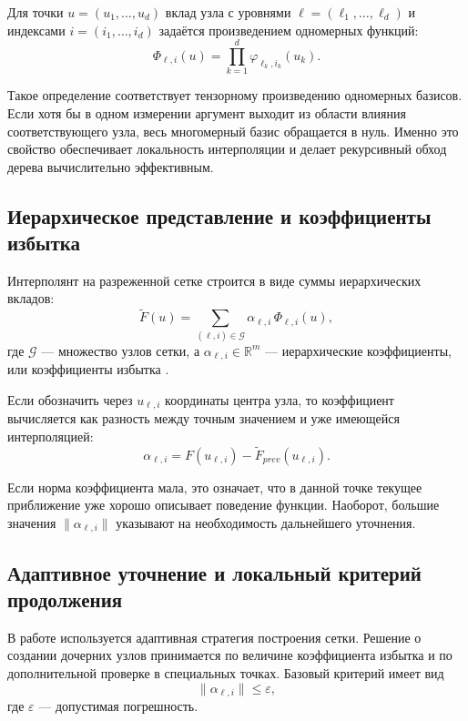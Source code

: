 Для точки $u = (u_1, \dots, u_d)$ вклад узла с уровнями $\ell = (\ell_1, \dots, \ell_d)$ и индексами $i = (i_1, \dots, i_d)$ задаётся произведением одномерных функций:
\begin{equation}
    \Phi_{\ell,i}(u) = \prod_{k=1}^{d} \varphi_{\ell_k,i_k}(u_k).
\end{equation}

Такое определение соответствует тензорному произведению одномерных базисов. Если хотя бы в одном измерении аргумент выходит из области влияния соответствующего узла, весь многомерный базис обращается в нуль. Именно это свойство обеспечивает локальность интерполяции и делает рекурсивный обход дерева вычислительно эффективным.

\subsection{Иерархическое представление и коэффициенты избытка}

Интерполянт на разреженной сетке строится в виде суммы иерархических вкладов:
\begin{equation}
    \widetilde{F}(u) = \sum_{(\ell,i) \in \mathcal{G}} \alpha_{\ell,i} \, \Phi_{\ell,i}(u),
\end{equation}
где $\mathcal{G}$ --- множество узлов сетки, а $\alpha_{\ell,i} \in \mathbb{R}^m$ --- иерархические коэффициенты, или коэффициенты избытка \cite{Bungartz2004}.

Если обозначить через $u_{\ell,i}$ координаты центра узла, то коэффициент вычисляется как разность между точным значением и уже имеющейся интерполяцией:
\begin{equation}
    \alpha_{\ell,i} = F(u_{\ell,i}) - \widetilde{F}_{prev}(u_{\ell,i}).
\end{equation}

Если норма коэффициента мала, это означает, что в данной точке текущее приближение уже хорошо описывает поведение функции. Наоборот, большие значения $\|\alpha_{\ell,i}\|$ указывают на необходимость дальнейшего уточнения.

\subsection{Адаптивное уточнение и локальный критерий продолжения}

В работе используется адаптивная стратегия построения сетки. Решение о создании дочерних узлов принимается по величине коэффициента избытка и по дополнительной проверке в специальных точках. Базовый критерий имеет вид
\begin{equation}
    \|\alpha_{\ell,i}\| \leq \varepsilon,
\end{equation}
где $\varepsilon$ --- допустимая погрешность.

